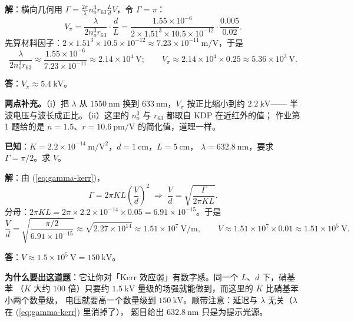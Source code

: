 \documentclass[11pt]{ctexart}
\let\subhdrtheme\subhdr
\renewcommand{\subhdr}[1]{\needspace{3\baselineskip}\subhdrtheme{#1}}
\begin{document}
\textbf{解}：横向几何用 $\Gamma=\frac{2\pi}{\lambda}n_o^3r_{63}\frac{L}{d}V$，令 $\Gamma=\pi$：
\begin{equation}
V_\pi=\frac{\lambda}{2n_o^3r_{63}}\cdot\frac{d}{L}
=\frac{1.55\times10^{-6}}{2\times1.51^3\times10.5\times10^{-12}}\cdot\frac{0.005}{0.02}.
\end{equation}
先算材料因子：$2\times1.51^3\times10.5\times10^{-12}\approx7.23\times10^{-11}\ \mathrm{m/V}$，于是
\begin{equation}
\frac{\lambda}{2n_o^3r_{63}}\approx\frac{1.55\times10^{-6}}{7.23\times10^{-11}}\approx2.14\times10^{4}\ \mathrm{V};
\qquad
V_\pi\approx2.14\times10^{4}\times0.25\approx5.36\times10^{3}\ \mathrm{V}.
\end{equation}

\textbf{答}：$V_\pi\approx5.4\ \mathrm{kV}$。

\textbf{两点补充。}（i）把 $\lambda$ 从 $1550\ \mathrm{nm}$ 换到 $633\ \mathrm{nm}$，$V_\pi$ 按正比缩小到约 $2.2\ \mathrm{kV}$——
半波电压与波长成正比。（ii）这里的 $n_o^3$ 与 $r_{63}$ 都取自 KDP 在近红外的值；
作业第 1 题给的是 $n=1.5$、$r=10.6\ \mathrm{pm/V}$ 的简化值，道理一样。


\textbf{已知}：$K=2.2\times10^{-14}\ \mathrm{m/V^2}$，$d=1\ \mathrm{cm}$，$L=5\ \mathrm{cm}$，
$\lambda=632.8\ \mathrm{nm}$，要求 $\Gamma=\pi/2$。求 $V$。

\textbf{解}：由 (\ref{eq:gamma-kerr})，
\begin{equation}
\Gamma=2\pi KL\left(\frac{V}{d}\right)^2
\;\Longrightarrow\;
\frac{V}{d}=\sqrt{\frac{\Gamma}{2\pi KL}} .
\end{equation}
分母：$2\pi KL=2\pi\times2.2\times10^{-14}\times0.05=6.91\times10^{-15}$。于是
\begin{equation}
\frac{V}{d}=\sqrt{\frac{\pi/2}{6.91\times10^{-15}}}\approx\sqrt{2.27\times10^{14}}\approx1.51\times10^{7}\ \mathrm{V/m},
\qquad
V\approx1.51\times10^{7}\times0.01\approx1.51\times10^{5}\ \mathrm{V}.
\end{equation}

\textbf{答}：$V\approx1.5\times10^{5}\ \mathrm{V}=150\ \mathrm{kV}$。

\textbf{为什么要出这道题}：它让你对「Kerr 效应弱」有数字感。同一个 $L$、$d$ 下，硝基苯
（$K$ 大约 $100$ 倍）只要约 $1.5\ \mathrm{kV}$ 量级的场强就能做到，而这里的 $K$ 比硝基苯小两个数量级，
电压就要高一个数量级到 $150\ \mathrm{kV}$。顺带注意：延迟与 $\lambda$ 无关（$\lambda$ 在 (\ref{eq:gamma-kerr}) 里消掉了），
题目给出 $632.8\ \mathrm{nm}$ 只是为提示光源。
\end{document}
